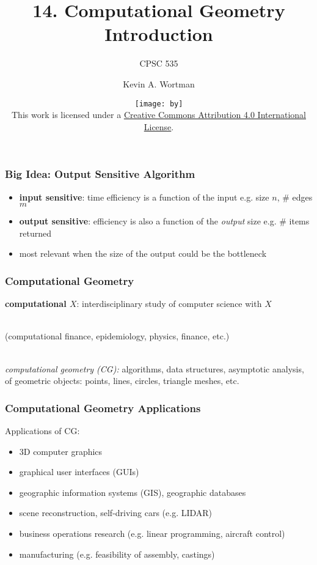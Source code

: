 \documentclass{beamer}
\title{14. Computational Geometry Introduction}
\subtitle{CPSC 535}
\author{Kevin A. Wortman}
\institute{ \texttt{[image: csuf-logo-cmyk]} }
\date{\texttt{[image: by]} \\

{\tiny
This work is licensed under a
\href{http://creativecommons.org/licenses/by/4.0/}{Creative Commons Attribution 4.0 International License}.
}}
\newcommand{\stanza}{ \\~\ }
\begin{document}
\begin{frame}
  \titlepage
\end{frame}

\begin{frame} \frametitle{Big Idea: Output Sensitive Algorithm}
  \begin{itemize}
    \item \textbf{input sensitive}: time efficiency is a function of the input
      e.g. size $n$, \# edges $m$
    \item \textbf{output sensitive}: efficiency is also a function of the
      \emph{output} size e.g. \# items returned
    \item most relevant when the size of the output could be the
      bottleneck
  \end{itemize}
\end{frame}

\begin{frame} \frametitle{Computational Geometry}
\textbf{computational $X$}: interdisciplinary study of computer science with $X$ \stanza

(computational finance, epidemiology, physics, finance, etc.) \stanza

\emph{computational geometry (CG):} algorithms, data structures, asymptotic analysis, of
geometric objects: points, lines, circles, triangle meshes, etc.
\end{frame}

\begin{frame} \frametitle{Computational Geometry Applications}

Applications of CG:
\begin{itemize}
  \item 3D computer graphics
  \item graphical user interfaces (GUIs)
  \item geographic information systems (GIS), geographic databases
  \item scene reconstruction, self-driving cars (e.g. LIDAR)
  \item business operations research (e.g. linear programming, aircraft control)
  \item manufacturing (e.g. feasibility of assembly, castings)
\end{itemize}
\end{frame}
\end{document}
